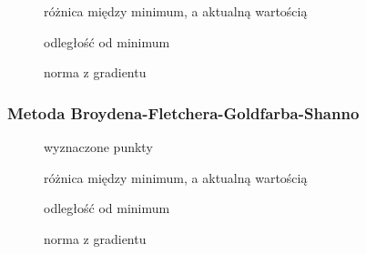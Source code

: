 \documentclass[a4paper, 10pt]{article}
\begin{document}
			
			    \begin{figure}[H]
			        \centering
			        \def \svgwidth{0.75\columnwidth}
			        
			        \caption{różnica między minimum, a aktualną wartością}
			    \end{figure}\noindent
			
			
			    \begin{figure}[H]
			        \centering
			        \def \svgwidth{0.75\columnwidth}
			        
			        \caption{odległość od minimum}
			    \end{figure}\noindent
			    
				\begin{figure}[H]
				   	\centering
				   	\def \svgwidth{0.75\columnwidth}
				   	
				   	\caption{norma z gradientu}
				\end{figure}\noindent
			\subsubsection{Metoda Broydena-Fletchera-Goldfarba-Shanno}
		
			    \begin{figure}[H]
			        \centering
			        \def \svgwidth{0.75\columnwidth}
			        
			        \caption{wyznaczone punkty}
			    \end{figure}\noindent
			
			
			    \begin{figure}[H]
			        \centering
			        \def \svgwidth{0.75\columnwidth}
			        
			        \caption{różnica między minimum, a aktualną wartością}
			    \end{figure}\noindent
			
			
			    \begin{figure}[H]
			        \centering
			        \def \svgwidth{0.75\columnwidth}
			        
			        \caption{odległość od minimum}
			    \end{figure}\noindent
				\begin{figure}[H]
				   	\centering
				   	\def \svgwidth{0.75\columnwidth}
				   	
				   	\caption{norma z gradientu}
				\end{figure}\noindent
		
\end{document}
